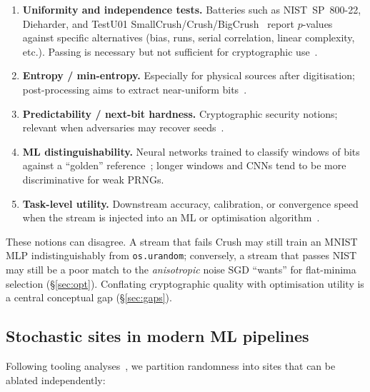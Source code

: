 \begin{enumerate}[leftmargin=*]
  \item \textbf{Uniformity and independence tests.}
  Batteries such as NIST~SP~800-22, Dieharder, and TestU01 SmallCrush/Crush/BigCrush~\cite{bassham2010nist,lecuyer2007testu01} report $p$-values against specific alternatives (bias, runs, serial correlation, linear complexity, etc.).
  Passing is necessary but not sufficient for cryptographic use~\cite{soto1999statistical}.

  \item \textbf{Entropy / min-entropy.}
  Especially for physical sources after digitisation; post-processing aims to extract near-uniform bits~\cite{herrero2017quantum}.

  \item \textbf{Predictability / next-bit hardness.}
  Cryptographic security notions; relevant when adversaries may recover seeds~\cite{dahiya2024mlrandomness}.

  \item \textbf{ML distinguishability.}
  Neural networks trained to classify windows of bits against a ``golden'' reference~\cite{valle2024assessing}; longer windows and CNNs tend to be more discriminative for weak PRNGs.

  \item \textbf{Task-level utility.}
  Downstream accuracy, calibration, or convergence speed when the stream is injected into an ML or optimisation algorithm~\cite{bird2019softcomputing,koivu2022dropout,bastos2009pso}.
\end{enumerate}

\begin{remark}
These notions can disagree.
A stream that fails Crush may still train an MNIST MLP indistinguishably from \texttt{os.urandom}; conversely, a stream that passes NIST may still be a poor match to the \emph{anisotropic} noise SGD ``wants'' for flat-minima selection (\S\ref{sec:opt}).
Conflating cryptographic quality with optimisation utility is a central conceptual gap (\S\ref{sec:gaps}).
\end{remark}

\subsection{Stochastic sites in modern ML pipelines}

Following tooling analyses~\cite{zhuang2022randomness,summers2021nondeterminism}, we partition randomness into sites that can be ablated independently:


